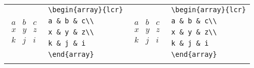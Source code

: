 \documentclass[10pt, english]{article}
\begin{document}
	\begin{center}
		\scriptsize
	\begin{tabular}{ll|ll}
		\multirow{5}{*}{$\begin{array}{lcr}a & b & c\\ x & y & z\\ k & j & i\end{array}$} & \verb|\begin{array}{lcr}| & \multirow{5}{*}{$\begin{array}{lcr}a & b & c\\\hline x & y & z\\\hline k & j & i\end{array}$} & \verb|\begin{array}{lcr}| \\
		& \verb|a & b & c\\| & & \verb|a & b & c\\| \\
		& \verb|x & y & z\\| & & \verb|x & y & z\\| \\
		& \verb|k & j & i| & & \verb|k & j & i| \\
		& \verb|\end{array}| & & \verb|\end{array}| \\
		& & & \\
	\end{tabular}
	\end{center}
\end{document}
